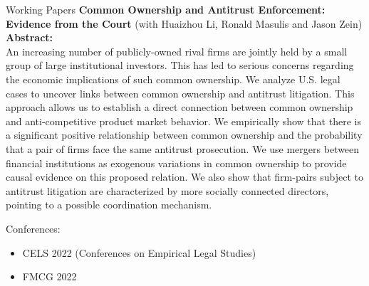 \documentclass{resume} %
\begin{document}
\begin{rSection}{Working Papers}
	{\bf Common Ownership and Antitrust Enforcement: Evidence from the Court} (with Huaizhou Li, Ronald Masulis and Jason Zein)\\
	{\bf Abstract:}\\
	An increasing number of publicly-owned rival firms are jointly held by a small group of large institutional investors. This has led to serious concerns regarding the economic implications of such common ownership. We analyze U.S. legal cases to uncover links between common ownership and antitrust litigation. This approach allows us to establish a direct connection between common ownership and anti-competitive product market behavior. We empirically show that there is a significant positive relationship between common ownership and the probability that a pair of firms face the same antitrust prosecution. We use mergers between financial institutions as exogenous variations in common ownership to provide causal evidence on this proposed relation. We also show that firm-pairs subject to antitrust litigation are characterized by more socially connected directors, pointing to a possible coordination mechanism.

	Conferences:

	\begin{itemize}
		\item CELS 2022 (Conferences on Empirical Legal Studies)
		\item FMCG 2022
	\end{itemize}




\end{rSection}
\end{document}
